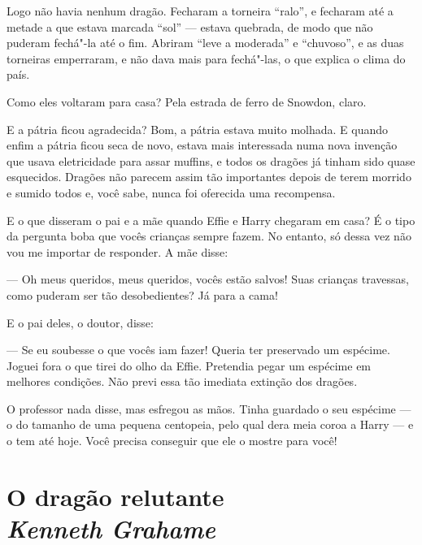 Logo não havia nenhum dragão. Fecharam a torneira
“ralo”, e fecharam até a metade a que estava marcada “sol” --- estava
quebrada, de modo que não puderam fechá"-la até o fim. Abriram “leve a
moderada” e “chuvoso”, e as duas torneiras emperraram, e não dava
mais para fechá"-las, o que explica o clima do país.
\bigskip
\bigskip

\noindent Como eles voltaram para casa? Pela estrada de ferro de Snowdon, claro.

E a pátria ficou agradecida? Bom, a pátria estava muito molhada. E
quando enfim a pátria ficou seca de novo, estava mais interessada numa
nova invenção que usava eletricidade para assar muffins, e todos os
dragões já tinham sido quase esquecidos. Dragões não parecem assim
tão importantes depois de terem morrido e sumido todos e, você sabe,
nunca foi oferecida uma recompensa.

E o que disseram o pai e a mãe quando Effie e Harry chegaram em casa?
É o tipo da pergunta boba que vocês crianças sempre fazem. No
entanto, só dessa vez não vou me importar de responder. A mãe disse:

--- Oh meus queridos, meus queridos, vocês estão salvos! Suas crianças
travessas, como puderam ser tão desobedientes? Já para a cama!

E o pai deles, o doutor, disse:

--- Se eu soubesse o que vocês iam fazer! Queria ter preservado um
espécime. Joguei fora o que tirei do olho da Effie. Pretendia pegar
um espécime em melhores condições. Não previ essa tão imediata
extinção dos dragões.

O professor nada disse, mas esfregou as mãos. Tinha guardado o seu
espécime --- o do tamanho de uma pequena centopeia, pelo qual dera meia			%
coroa a Harry --- e o tem até hoje. Você precisa conseguir que ele o
mostre para você!

\chapter[O dragão relutante\\{\itshape Kenneth Grahame}]{O dragão relutante\\{\LARGE\itshape Kenneth Grahame }}

